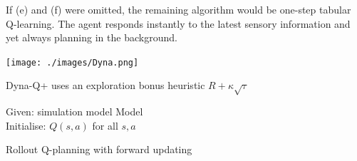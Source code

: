 \documentclass[10pt,landscape]{article}
\begin{document}
\begin{multicols}{3}
If (e) and (f) were omitted, the remaining algorithm would be one-step tabular Q-learning. The agent responds instantly to the latest sensory information and yet always planning in the background.

\begin{center}
\texttt{[image: ./images/Dyna.png]}
\end{center}





Dyna-Q+ uses an exploration bonus heuristic $R+ \kappa \sqrt{\tau}$

\begin{algorithm}[H]
Given: simulation model Model \\
Initialise: $Q(s,a)$ for all $s,a$ \\

\caption{Rollout Q-planning with forward updating}
\end{algorithm}


\end{multicols}
\end{document}
